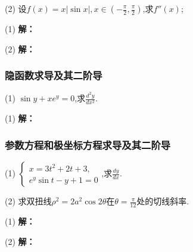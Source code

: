 \documentclass[12pt , a4paper , oneside]{ctexart}
\begin{document}
            (2) 设$f(x) = x|\sin{x}|,x\in (-\frac{\pi}{2},\frac{\pi}{2})$,求$f''(x)$;
            
            \begin{mdframed}
            (1) \textbf{解：}

            \end{mdframed}

            \begin{mdframed}
            (2) \textbf{解：}

            \end{mdframed}

            \subsubsection{隐函数求导及其二阶导}
            (1) $\sin y+x e^y = 0$,求$\frac{d^2 y}{dx^2}$.

            \begin{mdframed}
            (1) \textbf{解：}

            \end{mdframed}

            \subsubsection{参数方程和极坐标方程求导及其二阶导}
            (1) $\begin{cases}
                x=3t^2+2t+3,\\
                e^y \sin{t}-y+1=0
            \end{cases}$,求$\frac{dy}{dx}$.

            (2) 求双扭线$\rho^2 = 2a^2 \cos{2\theta}$在$\theta = \frac{\pi}{12}$处的切线斜率.
            
            \begin{mdframed}
            (1) \textbf{解：}

            \end{mdframed}
            
            \begin{mdframed}
            (2) \textbf{解：}

            \end{mdframed}
\end{document}
